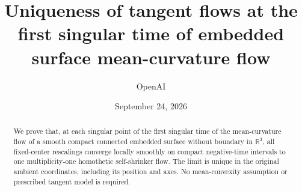 \documentclass[11pt,reqno]{amsart}
\title[Uniqueness of tangent flows]{Uniqueness of tangent flows at the first singular time of embedded surface mean-curvature flow}
\author{OpenAI}
\date{September 24, 2026}
\theoremstyle{definition}
\numberwithin{equation}{section}
\providecommand{\R}{\mathbb R}
\begin{document}
\begin{abstract}
We prove that, at each singular point of the first singular time of the
mean-curvature flow of a smooth compact connected embedded surface without
boundary in $\R^3$, all fixed-center rescalings converge locally smoothly
on compact negative-time intervals to one multiplicity-one homothetic
self-shrinker flow. The limit is unique in the original ambient coordinates,
including its position and axes. No mean-convexity assumption or prescribed
tangent model is required.
\end{abstract}
\maketitle
\tableofcontents















\end{document}
